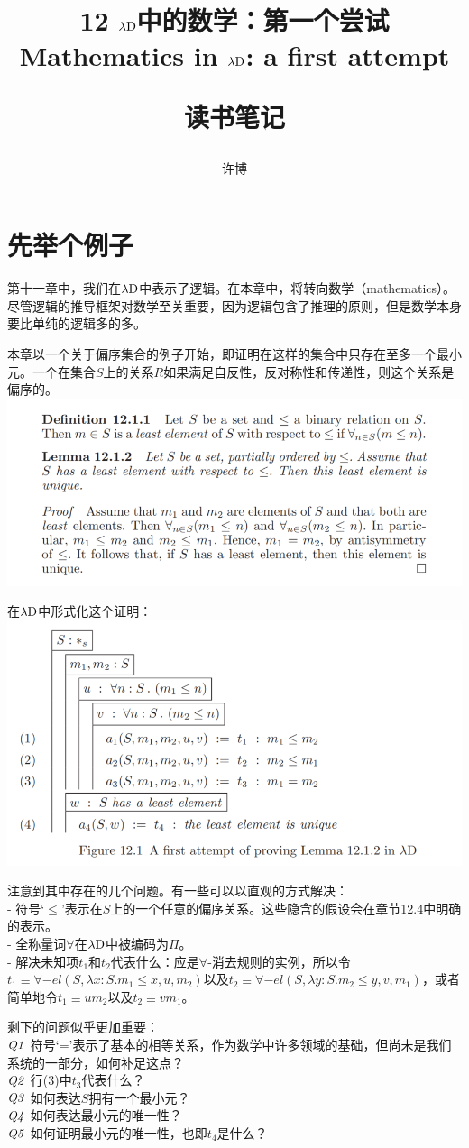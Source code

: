 \documentclass[UTF8]{article}
\title{12 $\lambda{\rm D}$中的数学：第一个尝试\\Mathematics in $\lambda{\rm D}$: a first attempt\\[2ex]\begin{large}读书笔记\end{large}}
\author{许博}
\date{}
\begin{document}
\maketitle
	\section{先举个例子}
	\noindent
	第十一章中，我们在$\lambda{\rm D}$中表示了逻辑。在本章中，将转向数学（mathematics）。尽管逻辑的推导框架对数学至关重要，因为逻辑包含了推理的原则，但是数学本身要比单纯的逻辑多的多。
	
		本章以一个关于偏序集合的例子开始，即证明在这样的集合中只存在至多一个最小元。一个在集合$S$上的关系$R$如果满足自反性，反对称性和传递性，则这个关系是偏序的。\\
		\includegraphics[width=0.93\linewidth]{"../imgs/12-1.png"}
		
		在$\lambda{\rm D}$中形式化这个证明：\\
		\includegraphics[width=0.93\linewidth]{"../imgs/12-2.png"}
		
		注意到其中存在的几个问题。有一些可以以直观的方式解决：\\
		- 符号`$\le$'表示在$S$上的一个任意的偏序关系。这些隐含的假设会在章节12.4中明确的表示。\\
		- 全称量词$\forall$在$\lambda{\rm D}$中被编码为$\Pi$。\\
		- 解决未知项$t_1$和$t_2$代表什么：应是$\forall$-消去规则的实例，所以令$t_1\equiv\forall{-el}(S,\lambda x:S.m_1\le x,u,m_2)$以及$t_2\equiv\forall{-el}(S,\lambda y:S.m_2\le y,v,m_1)$，或者简单地令$t_1\equiv um_2$以及$t_2\equiv vm_1$。
		
		剩下的问题似乎更加重要：\\
		$\it{Q1}$ 符号`='表示了基本的相等关系，作为数学中许多领域的基础，但尚未是我们系统的一部分，如何补足这点？\\
		$\it{Q2}$ 行(3)中$t_3$代表什么？\\
		$\it{Q3}$ 如何表达$S$拥有一个最小元？\\
		$\it{Q4}$ 如何表达最小元的唯一性？\\
		$\it{Q5}$ 如何证明最小元的唯一性，也即$t_4$是什么？
\end{document}
